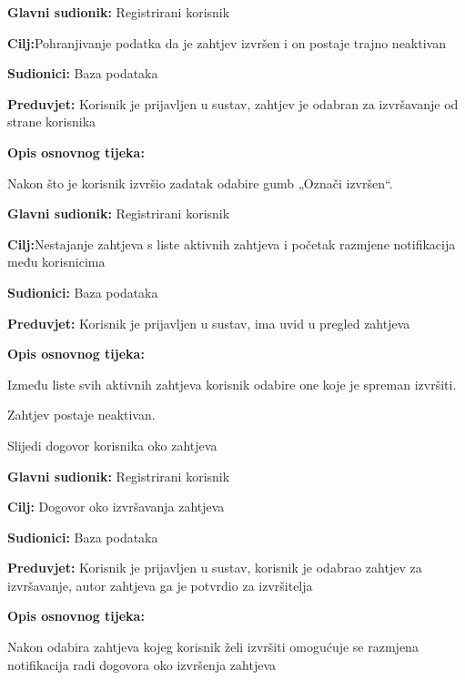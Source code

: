 \noindent {}
\begin{packed_item}
	\item \textbf{Glavni sudionik: }Registrirani korisnik
	\item  \textbf{Cilj:}Pohranjivanje podatka da je zahtjev izvršen i on postaje trajno neaktivan
	\item  \textbf{Sudionici:} Baza podataka
	\item  \textbf{Preduvjet:} Korisnik je prijavljen u sustav, zahtjev je odabran za izvršavanje od strane korisnika
	\item  \textbf{Opis osnovnog tijeka:}
	\item[] \begin{packed_enum}
		\item 	Nakon što je korisnik izvršio zadatak odabire gumb „Označi izvršen“. 
	\end{packed_enum}
\end{packed_item}
\newpage
\noindent {}
\begin{packed_item}
	\item \textbf{Glavni sudionik: }Registrirani korisnik
	\item  \textbf{Cilj:}Nestajanje zahtjeva s liste aktivnih zahtjeva i početak razmjene notifikacija među korisnicima 
	\item  \textbf{Sudionici:} Baza podataka
	\item  \textbf{Preduvjet:} Korisnik je prijavljen u sustav, ima uvid u pregled zahtjeva
	\item  \textbf{Opis osnovnog tijeka:}
	\item[] \begin{packed_enum}
		\item Između liste svih aktivnih zahtjeva korisnik odabire one koje je spreman izvršiti.
		\item Zahtjev postaje neaktivan.
		\item 	Slijedi dogovor korisnika oko zahtjeva
	\end{packed_enum}
\end{packed_item}

\noindent {}
\begin{packed_item}
	\item \textbf{Glavni sudionik: } Registrirani korisnik
	\item  \textbf{Cilj:} Dogovor oko izvršavanja zahtjeva
	\item  \textbf{Sudionici:} Baza podataka
	\item  \textbf{Preduvjet:} Korisnik je prijavljen u sustav, korisnik je odabrao zahtjev za izvršavanje, autor zahtjeva ga je potvrdio za izvršitelja
	\item  \textbf{Opis osnovnog tijeka:}
	\item[] \begin{packed_enum}
		\item Nakon odabira zahtjeva kojeg korisnik želi izvršiti omogućuje se razmjena notifikacija radi dogovora oko izvršenja zahtjeva 
	\end{packed_enum}
\end{packed_item}

